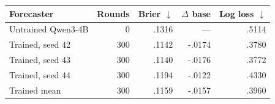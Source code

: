 \begin{tabular}{lrrrr}
\toprule
Forecaster & Rounds & Brier $\downarrow$ & $\Delta$ base & Log loss $\downarrow$ \\
\midrule
Untrained Qwen3-4B       & 0   & .1316 & ---    & .5114 \\
Trained, seed 42         & 300 & .1142 & -.0174 & .3780 \\
Trained, seed 43         & 300 & .1140 & -.0176 & .3772 \\
Trained, seed 44         & 300 & .1194 & -.0122 & .4330 \\
Trained mean             & 300 & .1159 & -.0157 & .3960 \\
\bottomrule
\end{tabular}

